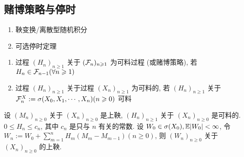 \subsection{赌博策略与停时}

\begin{enumerate}
    \item 鞅变换/离散型随机积分
    \item 可选停时定理
\end{enumerate}

\begin{definition}
    \begin{enumerate}
        \item 过程 $(H_n)_{n\geq 1}$ 关于 $(\mathcal{F}_n)_{n\geqslant 1}$ 为可料过程 (或赌博策略), 若 $H_n\in \mathcal{F}_{n-1}(\forall n\geqslant 1)$
        \item 过程 $(H_n)_{n\geq 1}$ 关于过程 $(X_n)_{n\geq 1}$ 为可料的, 若 $(H_n)_{n\geq 1}$ 关于 $\mathcal{F}_n^X:=\sigma(X_0,X_1,\cdots,X_n) (n\geqslant 0)$ 可料
    \end{enumerate}
\end{definition}

\begin{theorem}
设 $(M_n)_{n\geq 0}$ 关于 $(X_n)_{n\geq 0}$ 是上鞅, $(H_n)_{n\geq 1}$ 关于 $(X_n)_{n\geq 0}$ 是可料的. $0\leq H_n\leq c_n$, 其中 $c_n$ 是只与 $n$ 有关的常数. 设 $W_0\in \sigma(X_0), \mathbb E|W_0|<\infty$, 令 $W_n:=W_0+\sum_{m=1}^n H_m(M_m-M_{m-1})(n\geq 0)$, 则 $(W_n)_{n\geq 0}$ 关于 $(X_n)_{n\geq 0}$ 的上鞅.
\end{theorem}

